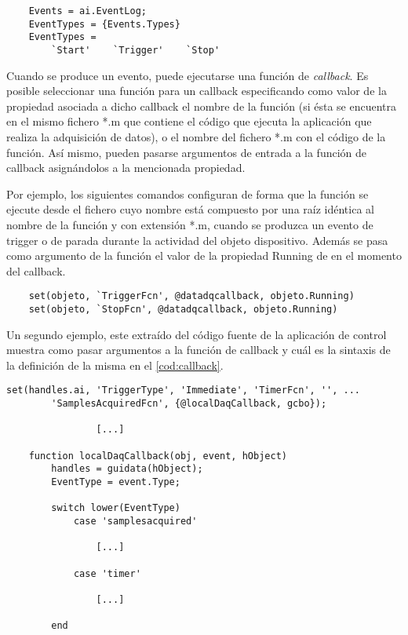 \begin{lstlisting}
	Events = ai.EventLog;
	EventTypes = {Events.Types}
	EventTypes =
		`Start'    `Trigger'	`Stop'
\end{lstlisting}

Cuando se produce un evento, puede ejecutarse una función de
\emph{callback}. Es posible seleccionar una función para un callback
especificando como valor de la propiedad asociada a dicho callback el
nombre de la función (si ésta se encuentra en el mismo fichero *.m que
contiene el código que ejecuta la aplicación que realiza la adquisición de
datos), o el nombre del fichero *.m con el código de la función. Así mismo,
pueden pasarse argumentos de entrada a la función de callback asignándolos
a la mencionada propiedad.

Por ejemplo, los siguientes comandos configuran  de forma que
la función  se ejecute desde el fichero cuyo nombre
está compuesto por una raíz idéntica al nombre de la función y con
extensión *.m, cuando se produzca un evento de trigger o de parada durante
la actividad del objeto dispositivo. Además se pasa como argumento de la
función el valor de la propiedad \textsf{Running} de  en el
momento del callback.

\begin{lstlisting}
	set(objeto, `TriggerFcn', @datadqcallback, objeto.Running)
	set(objeto, `StopFcn', @datadqcallback, objeto.Running)
\end{lstlisting}

Un segundo ejemplo, este extraído del código fuente de la aplicación de
control muestra como pasar argumentos a la función de callback y cuál es la
sintaxis de la definición de la misma en el \cref{cod:callback}.

\begin{lstlisting}[style=displayed, caption={[Configuración de
	\emph{callback}]{Configuración de \emph{callback} para responder a
	eventos en la sesión de muestreo, la función de \emph{callback}
	recibe un argumento.}}, label={cod:callback}]
	set(handles.ai, 'TriggerType', 'Immediate', 'TimerFcn', '', ...
		'SamplesAcquiredFcn', {@localDaqCallback, gcbo});

				[...]

	function localDaqCallback(obj, event, hObject)
		handles = guidata(hObject);
		EventType = event.Type;

		switch lower(EventType)
			case 'samplesacquired'

				[...]

			case 'timer'

				[...]

		end
\end{lstlisting}

